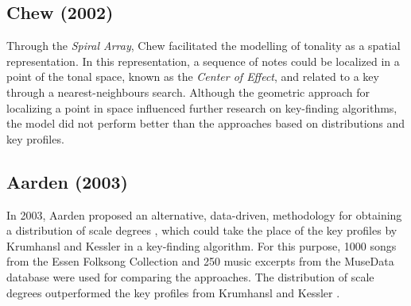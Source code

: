 \subsection{Chew (2002)}



Through the \emph{Spiral Array}, Chew \cite{chew2002spiral} facilitated the modelling of tonality as a spatial representation. In this representation, a sequence of notes could be localized in a point of the tonal space, known as the \emph{Center of Effect}, and related to a key through a nearest-neighbours search. Although the geometric approach for localizing a point in space influenced further research on key-finding algorithms, the model did not perform better than the approaches based on distributions and key profiles.

\subsection{Aarden (2003)}

In 2003, Aarden proposed an alternative, data-driven, methodology for obtaining a distribution of scale degrees \cite{aarden2003dynamic}, which could take the place of the key profiles by Krumhansl and Kessler \cite{krumhansl1982tracing} in a key-finding algorithm. For this purpose, 1000 songs from the Essen Folksong Collection and 250 music excerpts from the MuseData database were used for comparing the approaches. The distribution of scale degrees outperformed the key profiles from Krumhansl and Kessler \cite{krumhansl1982tracing}. 


